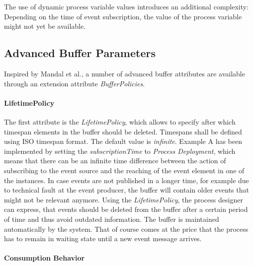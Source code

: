 The use of dynamic process variable values introduces an additional complexity: Depending on the time of event subscription, the value of the process variable might not yet be available.


\subsection{Advanced Buffer Parameters}\label{ch:bpmnx:bufferpolicies}
Inspired by Mandal et al., a number of advanced buffer attributes are available through an extension attribute \textit{BufferPolicies}.

\paragraph{LifetimePolicy\newline}

The first attribute is the \textit{LifetimePolicy}, which allows to specify after which timespan elements in the buffer should be deleted. Timespans shall be defined using ISO timespan format. 
The default value is \textit{infinite}.
Example A has been implemented by setting the \textit{subscriptionTime} to \textit{Process Deployment}, which means that there can be an infinite time difference between the action of subscribing to the event source and the reaching of the event element in one of the instances.
In case events are not published in a longer time, for example due to technical fault at the event producer, the buffer will contain older events that might not be relevant anymore.
Using the \textit{LifetimePolicy}, the process designer can express, that events should be deleted from the buffer after a certain period of time and thus avoid outdated information. The buffer is maintained automatically by the system.
That of course comes at the price that the process has to remain in waiting state until a new event message arrives.

\paragraph{Consumption Behavior\newline}

